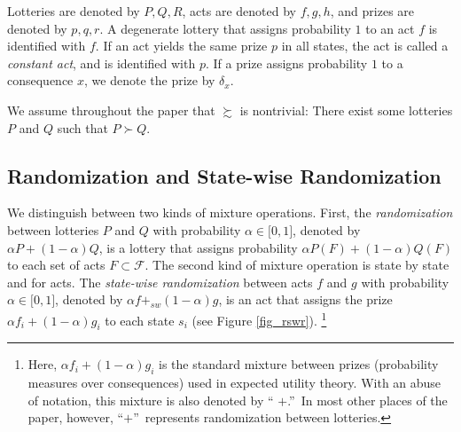 \documentclass[12pt, notitlepage]{article}
\begin{document}
Lotteries are denoted by $P,Q,R$, acts are denoted by $f,g,h$, and prizes
are denoted by $p,q,r$. A degenerate lottery that assigns probability $1$ to
an act $f$ is identified with $f$. If an act yields the same prize $p$ in
all states, the act is called a \textit{constant act}, and is identified
with $p$. If a prize assigns probability $1$ to a consequence $x$, we denote
the prize by $\delta _{x}$.

We assume throughout the paper that $\succsim $ is nontrivial: There exist
some lotteries $P$ and $Q$ such that $P\succ Q$.

\subsection{Randomization and State-wise Randomization}

\label{rswr}We distinguish between two kinds of mixture operations. First,
the \textit{randomization} between lotteries $P$ and $Q$ with probability $%
\alpha \in \lbrack 0,1]$, denoted by $\alpha P+(1-\alpha )Q$, is a lottery
that assigns probability $\alpha P(F)+(1-\alpha )Q(F)$ to each set of acts $%
F\subset \mathcal{F}$. The second kind of mixture operation is state by
state and for acts. The \textit{state-wise randomization} between acts $f$
and $g$ with probability $\alpha \in \lbrack 0,1]$, denoted by $\alpha
f+_{sw}(1-\alpha )g$, is an act that assigns the prize $\alpha
f_{i}+(1-\alpha )g_{i}$ to each state $s_{i}$ (see Figure \ref{fig_rswr}).%
\footnote{%
Here, $\alpha f_{i}+(1-\alpha )g_{i}$ is the standard mixture between prizes
(probability measures over consequences) used in expected utility theory.
With an abuse of notation, this mixture is also denoted by \textquotedblleft 
$+$.\textquotedblright\ In most other places of the paper, however,
\textquotedblleft $+$\textquotedblright\ represents randomization between
lotteries.}
\end{document}
